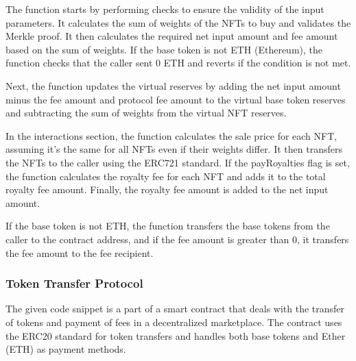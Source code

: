 The function starts by performing checks to ensure the validity of the
input parameters. It calculates the sum of weights of the NFTs to buy
and validates the Merkle proof. It then calculates the required net
input amount and fee amount based on the sum of weights. If the base
token is not ETH (Ethereum), the function checks that the caller sent 0
ETH and reverts if the condition is not met.

Next, the function updates the virtual reserves by adding the net input
amount minus the fee amount and protocol fee amount to the virtual base
token reserves and subtracting the sum of weights from the virtual NFT
reserves.

In the interactions section, the function calculates the sale price for
each NFT, assuming it's the same for all NFTs even if their weights
differ. It then transfers the NFTs to the caller using the ERC721
standard. If the payRoyalties flag is set, the function calculates the
royalty fee for each NFT and adds it to the total royalty fee amount.
Finally, the royalty fee amount is added to the net input amount.

If the base token is not ETH, the function transfers the base tokens
from the caller to the contract address, and if the fee amount is
greater than 0, it transfers the fee amount to the fee recipient.

\hypertarget{token-transfer-protocol}{%
\subsubsection{Token Transfer Protocol}\label{token-transfer-protocol}}

The given code snippet is a part of a smart contract that deals with the
transfer of tokens and payment of fees in a decentralized marketplace.
The contract uses the ERC20 standard for token transfers and handles
both base tokens and Ether (ETH) as payment methods.

